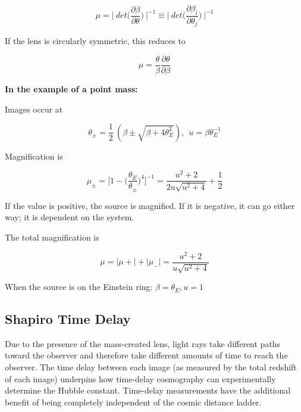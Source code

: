 \documentclass[12pt]{report}
\begin{document}
\begin{equation*}
    \mu = \Bigg| \ det \bigg( \dfrac{\partial \beta}{\partial \theta} \bigg) \ \Bigg|^{-1} \equiv \Bigg| \ det \bigg( \dfrac{\partial \beta_{i}}{\partial \theta_{j}} \bigg) \ \Bigg|^{-1}
\end{equation*}

If the lens is circularly symmetric, this reduces to 

\begin{equation*}
    \mu = \dfrac{\theta}{\beta} \dfrac{\partial \theta}{\partial \beta}
\end{equation*}

\newpage

\textbf{In the example of a point mass: }

Images occur at 

\begin{equation*}
    \theta_{\pm} = \frac{1}{2} \ ( \beta \pm \sqrt{\beta + 4\theta_{E}^{2}}), \ \ u = \beta \theta_{E}^{-1}
\end{equation*}


Magnification is 

\begin{equation*}
    \mu_{\pm} = \Bigg[1 - \bigg(\dfrac{\theta_{E}}{\theta_{\pm}} \bigg)^{4} \Bigg]^{-1} = \dfrac{u^{2} +2}{2u\sqrt{u^{2} +4}} + \frac{1}{2}
\end{equation*}

If the value is positive, the source is magnified. If it is negative, it can go either way; it is dependent on the system.

The total magnification is 

\begin{equation*}
    \mu = |\mu{+}| + |\mu_{-}| = \dfrac{u^{2} +2}{u\sqrt{u^{2} +4}}
\end{equation*}

When the source is on the Einstein ring: $\beta = \theta_{E}, u = 1$


\subsection{Shapiro Time Delay}

Due to the presence of the mass-created lens, light rays take different paths toward the observer and therefore take different amounts of time to reach the observer. The time delay between each image (as measured by the total redshift of each image) underpins how time-delay cosmography can experimentally determine the Hubble constant. Time-delay measurements have the additional benefit of being completely independent of the cosmic distance ladder. 
\end{document}
